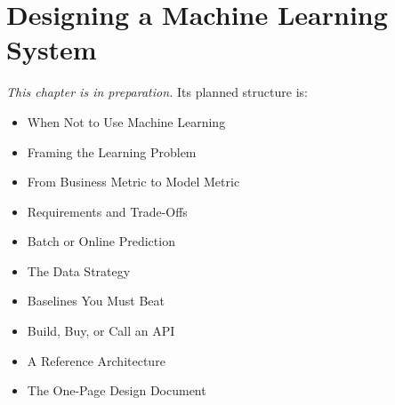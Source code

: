 
\chapter{Designing a Machine Learning System}
\label{ch:ch20}

\noindent\textit{This chapter is in preparation.} Its planned structure is:

\begin{itemize}
  \item When Not to Use Machine Learning
  \item Framing the Learning Problem
  \item From Business Metric to Model Metric
  \item Requirements and Trade-Offs
  \item Batch or Online Prediction
  \item The Data Strategy
  \item Baselines You Must Beat
  \item Build, Buy, or Call an API
  \item A Reference Architecture
  \item The One-Page Design Document
\end{itemize}
